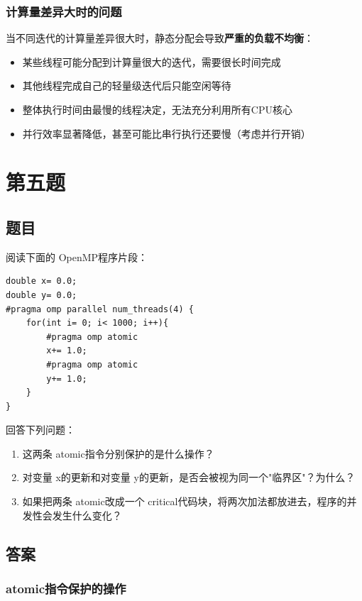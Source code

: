 \subsection{计算量差异大时的问题}

当不同迭代的计算量差异很大时，静态分配会导致\textbf{严重的负载不均衡}：

\begin{itemize}
    \item 某些线程可能分配到计算量很大的迭代，需要很长时间完成
    \item 其他线程完成自己的轻量级迭代后只能空闲等待
    \item 整体执行时间由最慢的线程决定，无法充分利用所有CPU核心
    \item 并行效率显著降低，甚至可能比串行执行还要慢（考虑并行开销）
\end{itemize}

\chapter{第五题}

\section{题目}

阅读下面的 OpenMP程序片段：
\begin{lstlisting}[style=cleancpp]
double x= 0.0; 
double y= 0.0;
#pragma omp parallel num_threads(4) { 
    for(int i= 0; i< 1000; i++){ 
        #pragma omp atomic 
        x+= 1.0;
        #pragma omp atomic 
        y+= 1.0; 
    } 
}
\end{lstlisting}

回答下列问题：
\begin{enumerate}
    \item 这两条 atomic指令分别保护的是什么操作？
    \item 对变量 x的更新和对变量 y的更新，是否会被视为同一个"临界区"？为什么？
    \item 如果把两条 atomic改成一个 critical代码块，将两次加法都放进去，程序的并发性会发生什么变化？
\end{enumerate}

\section{答案}
\subsection{atomic指令保护的操作}

